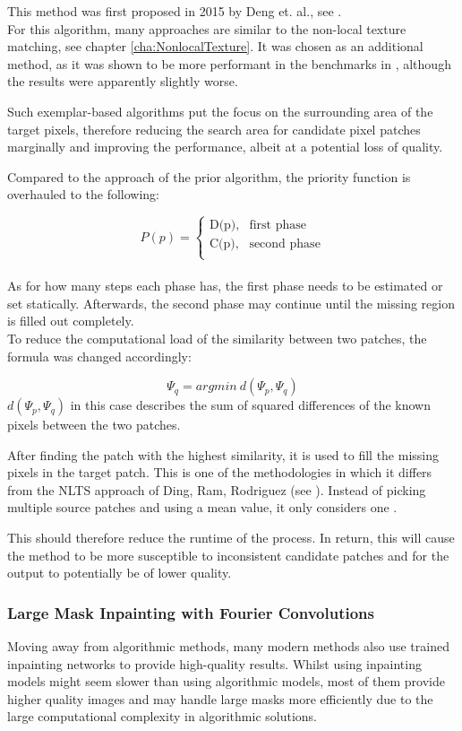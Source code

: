 This method was first proposed in 2015 by Deng et. al., see \cite{DengLiang-Jian2015EIIU}.\\
For this algorithm, many approaches are similar to the non-local texture matching, see chapter \ref{cha:NonlocalTexture}. It was chosen as an additional method, as it was shown to be more performant in the benchmarks in \cite{DingRam2019}, although the results were apparently slightly worse.

Such exemplar-based algorithms put the focus on the surrounding area of the target pixels, therefore reducing the search area for candidate pixel patches marginally and improving the performance, albeit at a potential loss of quality.

Compared to the approach of the prior algorithm, the priority function is overhauled to the following:

\[
  P(p) = 
  \begin{cases}
    \text{D(p),} & \text{first phase}\\
    \text{C(p),} & \text{second phase}\\
  \end{cases}
\]\\
As for how many steps each phase has, the first phase needs to be estimated or set statically. Afterwards, the second phase may continue until the missing region is filled out completely.\\
To reduce the computational load of the similarity between two patches, the formula was changed accordingly:

\[\Psi_q = argmin\ d(\Psi_p, \Psi_q)\]
$d(\Psi_p, \Psi_q)$ in this case describes the sum of squared differences of the known pixels between the two patches.

After finding the patch with the highest similarity, it is used to fill the missing pixels in the target patch. This is one of the methodologies in which it differs from the NLTS approach of Ding, Ram, Rodriguez (see \cite{DingRam2019}). Instead of picking multiple source patches and using a mean value, it only considers one \cite{DengLiang-Jian2015EIIU}.

This should therefore reduce the runtime of the process. In return, this will cause the method to be more susceptible to inconsistent candidate patches and for the output to potentially be of lower quality.

\subsubsection{Large Mask Inpainting with Fourier Convolutions}
\label{cha:LaMaTheory}
Moving away from algorithmic methods, many modern methods also use trained inpainting networks to provide high-quality results.
Whilst using inpainting models might seem slower than using algorithmic models, most of them provide higher quality images and may handle large masks more efficiently due to the large computational complexity in algorithmic solutions.

